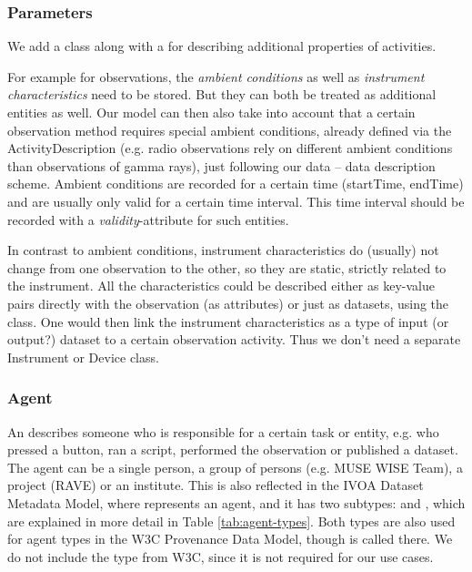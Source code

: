 



\subsubsection{Parameters}
We add a  class along with a  
for describing additional properties of activities.

For example for observations, the \emph{ambient conditions} as well as 
\emph{instrument characteristics} need to be stored. But they can both be treated
as additional entities as well. 
Our model can then also take into account that a certain observation
method requires special ambient conditions, already defined via the 
ActivityDescription (e.g. radio observations rely on different ambient 
conditions than observations
of gamma rays), just following our data -- data description scheme.
Ambient conditions are recorded for a certain time (startTime, endTime) and are
usually only valid for a certain time interval. This time interval should be recorded
with a \emph{validity}-attribute for such entities.

In contrast to ambient conditions, instrument characteristics do (usually) not
change from one observation to the other, so they are static, strictly related to
the instrument. 
All the characteristics could be described either as key-value pairs directly with the 
observation (as attributes) or just as datasets, using the  class. 
One would then 
link the instrument characteristics as a type of input (or output?) dataset to a certain 
observation activity. Thus we don't need a separate Instrument or Device class.



\subsubsection{Agent}\label{sec:w3c-agent}

An  describes someone who is responsible for a certain task or
entity, e.g. who pressed a button, 
ran a script, performed the observation or published a dataset.
The agent can be a single person, a group of persons (e.g. MUSE WISE Team), a 
project (RAVE) or an institute. 
This is also reflected in the IVOA Dataset Metadata Model, where  
represents an agent, and it has two subtypes:  and ,
which are explained in more detail in Table \ref{tab:agent-types}.
Both types are also used for agent types in the W3C Provenance Data Model, though 
 is called  there. 
We do not include the type  from W3C, since it is not required for 
our use cases.

